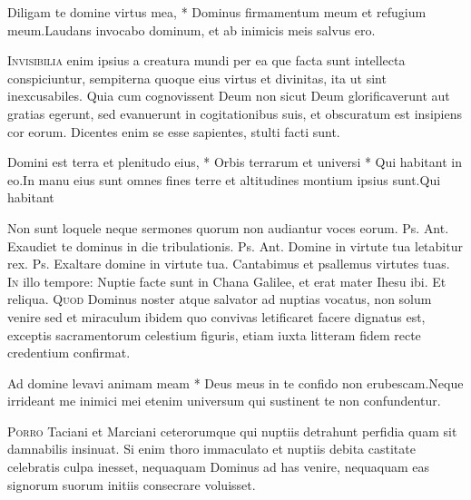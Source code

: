 \begin{multicols*}{2}
\begin{responsory}
{Diligam te domine virtus mea, * Dominus firmamentum meum et refugium meum.}{Laudans invocabo dominum, et ab inimicis meis salvus ero.}
\end{responsory}
\lettrine[lines=2]{\zallmancaps \color{Blue} I}{nvisibilia} enim ipsius a creatura mundi per ea que facta sunt intellecta conspiciuntur, sempiterna quoque eius virtus et divinitas, ita ut sint inexcusabiles. Quia cum cognovissent Deum non sicut Deum glorificaverunt aut gratias egerunt, sed evanuerunt in cogitationibus suis, et obscuratum est insipiens cor eorum. Dicentes enim se esse sapientes, stulti facti sunt.
\begin{responsory-final}
{Domini est terra et plenitudo eius, * Orbis terrarum et universi * Qui habitant in eo.}{In manu eius sunt omnes fines terre et altitudines montium ipsius sunt.}{Qui habitant}
\end{responsory-final}
 Non sunt loquele neque sermones quorum non audiantur voces eorum. {\color{Red} Ps.}  {\color{Red} Ant.} Exaudiet te dominus in die tribulationis. {\color{Red} Ps.}  {\color{Red} Ant.} Domine in virtute tua letabitur rex. {\color{Red} Ps.}  \V Exaltare domine in virtute tua. \R Cantabimus et psallemus virtutes tuas.
\lettrine[lines=2]{\zallmancaps \color{Red} I}{n} illo tempore: Nuptie facte sunt in Chana Galilee, et erat mater Ihesu ibi. Et reliqua.
 
\lettrine[lines=2]{\zallmancaps \color{Blue} Q}{uod} Dominus noster atque salvator ad nuptias vocatus, non solum venire sed et miraculum ibidem quo convivas
letificaret facere dignatus est, exceptis sacramentorum celestium figuris, etiam iuxta litteram fidem recte credentium confirmat.
\begin{responsory}
{Ad domine levavi animam meam * Deus meus in te confido non erubescam.}{Neque irrideant me inimici mei etenim universum qui sustinent te non confundentur.}
\end{responsory}
\lettrine[lines=2]{\zallmancaps \color{Red} P}{orro} Taciani et Marciani ceterorumque qui nuptiis detrahunt perfidia quam sit damnabilis insinuat. Si enim thoro immaculato et nuptiis debita castitate celebratis culpa inesset, nequaquam Dominus ad has venire, nequaquam eas signorum suorum initiis consecrare voluisset.

\end{multicols*}
